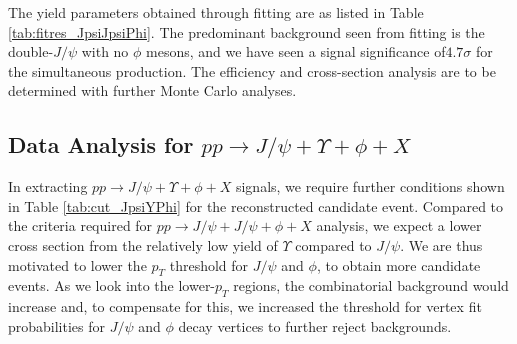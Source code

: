 \documentclass[10pt,twocolumn]{article}
\begin{document}
The yield parameters obtained through fitting are as listed in Table \ref{tab:fitres_JpsiJpsiPhi}. The predominant background seen from fitting is the double-$J/\psi$ with no $\phi$ mesons, and we have seen a signal significance of$4.7 \sigma$ for the simultaneous production. The efficiency and cross-section analysis are to be determined with further Monte Carlo analyses.

\subsection{Data Analysis for $pp\to J/\psi+\Upsilon+\phi+X$}

In extracting $pp\to J/\psi+\Upsilon+\phi+X$ signals, we require further conditions shown in Table \ref{tab:cut_JpsiYPhi} for the reconstructed candidate event. Compared to the criteria required for $pp \to J/\psi+J/\psi+\phi+X$ analysis, we expect a lower cross section from the relatively low yield of $\Upsilon$ compared to $J/\psi$. We are thus motivated to lower the $p_T$ threshold for $J/\psi$ and $\phi$, to obtain more candidate events. As we look into the lower-$p_T$ regions, the combinatorial background would increase and, to compensate for this, we increased the threshold for vertex fit probabilities for $J/\psi$ and $\phi$ decay vertices to further reject backgrounds.
\end{document}
